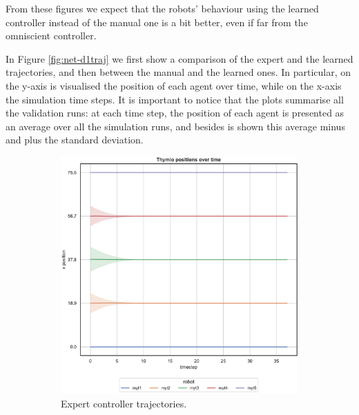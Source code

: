 From these figures we expect that the robots' behaviour using the learned 
controller instead of the manual one is a bit better, even if far from the omniscient 
controller.

In Figure \ref{fig:net-d1traj} we first show a comparison of the expert and the 
learned trajectories, and then between the manual and the learned ones. In 
particular, on the y-axis is visualised the position of each agent over time, while 
on the x-axis the simulation time steps. It is important to notice that the plots 
summarise all the validation runs: at each time step, the position of each agent is 
presented as an average over all the simulation runs, and besides is shown this 
average minus and plus the standard deviation.
\begin{figure}[!htb]
	\begin{center}
		\begin{subfigure}[h]{0.49\textwidth}
			\centering
			\includegraphics[width=.9\textwidth]{contents/images/net-d1/position-overtime-omniscient}%
			\caption{Expert controller trajectories.}
		\end{subfigure}
		\hfill
		\begin{subfigure}[h]{0.49\textwidth}
			\centering

\end{subfigure}
\end{center}
\end{figure}
